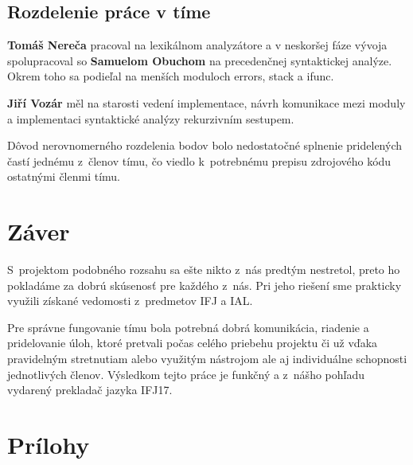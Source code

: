 \documentclass{article}
\begin{document}
        \subsection{Rozdelenie práce v tíme}

        \textbf{Tomáš Nereča} pracoval na lexikálnom analyzátore a v neskoršej fáze vývoja spolupracoval so \textbf{Samuelom Obuchom} na 
        precedenčnej syntaktickej analýze. Okrem toho sa podieľal na menších moduloch errors, stack a ifunc. 

        \textbf{Jiří Vozár} měl na starosti vedení implementace, návrh komunikace mezi moduly a implementaci syntaktické analýzy rekurzivním sestupem.

        Dôvod nerovnomerného rozdelenia bodov bolo nedostatočné splnenie pridelených častí jednému 
        z~členov tímu, čo viedlo k~potrebnému prepisu zdrojového kódu ostatnými členmi tímu.

    \section{Záver}
    S~projektom podobného rozsahu sa ešte nikto z~nás predtým nestretol, preto ho pokladáme za dobrú
    skúsenosť pre každého z~nás. Pri jeho riešení sme prakticky využili získané vedomosti z~predmetov 
    IFJ a IAL.
    
    Pre správne fungovanie tímu bola potrebná dobrá komunikácia, riadenie a pridelovanie úloh, ktoré pretvali počas celého
    priebehu projektu či už vďaka pravidelným stretnutiam alebo využitým nástrojom ale aj individuálne
    schopnosti jednotlivých členov. Výsledkom tejto práce je funkčný a z~nášho pohľadu vydarený 
    prekladač jazyka IFJ17.
    
    \newpage
    \section{Prílohy}
\end{document}
